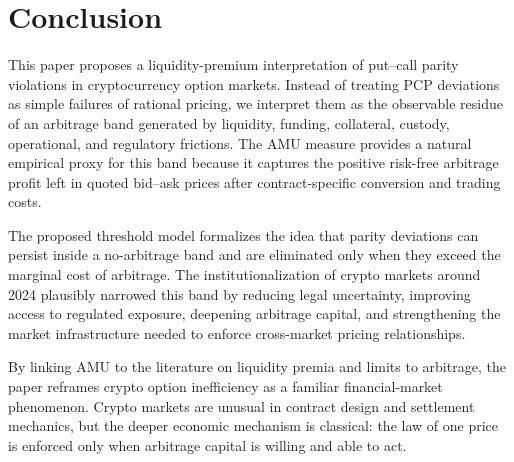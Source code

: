 \documentclass[12pt]{article}
\begin{document}
\section{Conclusion}

This paper proposes a liquidity-premium interpretation of put--call parity violations in cryptocurrency option markets. Instead of treating PCP deviations as simple failures of rational pricing, we interpret them as the observable residue of an arbitrage band generated by liquidity, funding, collateral, custody, operational, and regulatory frictions. The AMU measure provides a natural empirical proxy for this band because it captures the positive risk-free arbitrage profit left in quoted bid--ask prices after contract-specific conversion and trading costs.

The proposed threshold model formalizes the idea that parity deviations can persist inside a no-arbitrage band and are eliminated only when they exceed the marginal cost of arbitrage. The institutionalization of crypto markets around 2024 plausibly narrowed this band by reducing legal uncertainty, improving access to regulated exposure, deepening arbitrage capital, and strengthening the market infrastructure needed to enforce cross-market pricing relationships.

By linking AMU to the literature on liquidity premia and limits to arbitrage, the paper reframes crypto option inefficiency as a familiar financial-market phenomenon. Crypto markets are unusual in contract design and settlement mechanics, but the deeper economic mechanism is classical: the law of one price is enforced only when arbitrage capital is willing and able to act.


\end{document}
